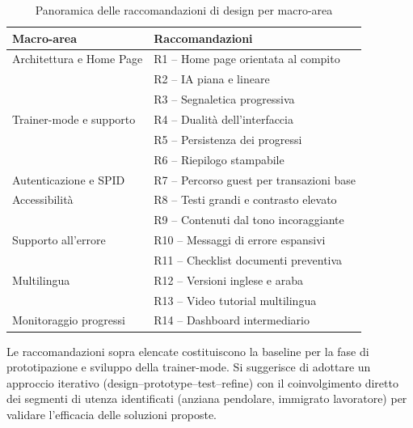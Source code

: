 \documentclass[11pt,a4paper]{article}
\begin{document}
\begin{table}[htbp]
\centering
\caption{Panoramica delle raccomandazioni di design per macro-area}
\label{tab:recommendations-summary}
\begin{tabular}{|p{2.8cm}|p{10cm}|}
\hline
\textbf{Macro-area} & \textbf{Raccomandazioni} \\
\hline
Architettura e Home Page & R1 -- Home page orientata al compito \\
& R2 -- IA piana e lineare \\
& R3 -- Segnaletica progressiva \\
\hline
Trainer-mode e supporto & R4 -- Dualit\`a dell'interfaccia \\
& R5 -- Persistenza dei progressi \\
& R6 -- Riepilogo stampabile \\
\hline
Autenticazione e SPID & R7 -- Percorso guest per transazioni base \\
\hline
Accessibilit\`a & R8 -- Testi grandi e contrasto elevato \\
& R9 -- Contenuti dal tono incoraggiante \\
\hline
Supporto all'errore & R10 -- Messaggi di errore espansivi \\
& R11 -- Checklist documenti preventiva \\
\hline
Multilingua & R12 -- Versioni inglese e araba \\
& R13 -- Video tutorial multilingua \\
\hline
Monitoraggio progressi & R14 -- Dashboard intermediario \\
\hline
\end{tabular}
\end{table}

\noindent Le raccomandazioni sopra elencate costituiscono la baseline per la
fase di prototipazione e sviluppo della trainer-mode. Si suggerisce di
adottare un approccio iterativo (design--prototype--test--refine) con il
coinvolgimento diretto dei segmenti di utenza identificati (anziana pendolare,
immigrato lavoratore) per validare
l'efficacia delle soluzioni proposte.
\end{document}
